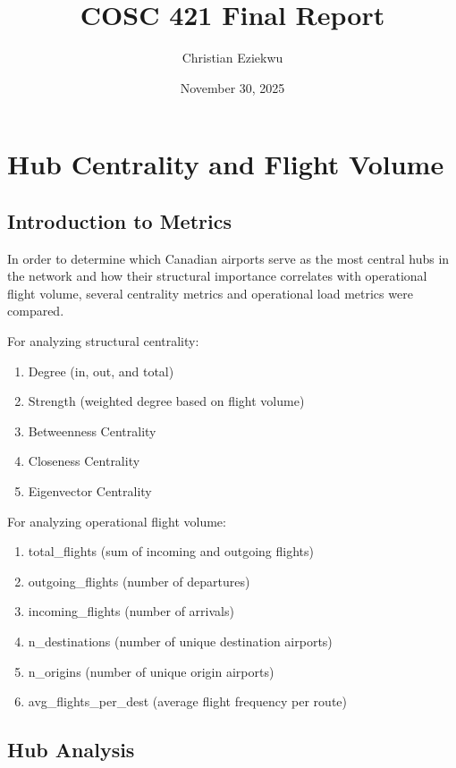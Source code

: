 \documentclass[10pt]{article}
\title{COSC 421 Final Report}
\author{Christian Eziekwu}
\date{November 30, 2025}
\begin{document}
\maketitle

\section{Hub Centrality and Flight Volume}

\subsection{Introduction to Metrics}

In order to determine which Canadian airports serve as the most central hubs in the network and how their structural importance correlates with operational flight volume, several centrality metrics and operational load metrics were compared.

For analyzing structural centrality:
\begin{enumerate}[label=\arabic*.]
    \item Degree (in, out, and total)
    \item Strength (weighted degree based on flight volume)
    \item Betweenness Centrality
    \item Closeness Centrality
    \item Eigenvector Centrality
\end{enumerate}


For analyzing operational flight volume:
\begin{enumerate}[label=\arabic*.]
    \item total\_flights (sum of incoming and outgoing flights)
    \item outgoing\_flights (number of departures)
    \item incoming\_flights (number of arrivals)
    \item n\_destinations (number of unique destination airports)
    \item n\_origins (number of unique origin airports)
    \item avg\_flights\_per\_dest (average flight frequency per route)
\end{enumerate}

\subsection{Hub Analysis}
\end{document}
